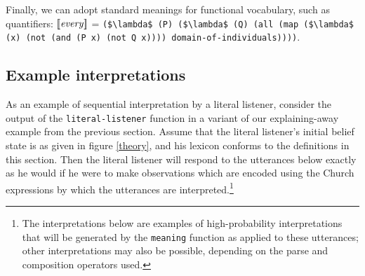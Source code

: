 \documentclass[pdfextras]{handbook}
\newcommand{\llbracket}{\ensuremath{\left [\!\left [}}%
\newcommand{\rrbracket}{\ensuremath{\right ]\!\right ]}}
\providecommand{\sv}[1]{\ensuremath{\llbracket \mathit{#1} \rrbracket}}
\begin{document}


Finally, we can adopt standard meanings for functional vocabulary, such as quantifiers: \sv{every} = \lstinline[mathescape]{($\lambda$ (P) ($\lambda$ (Q) (all (map ($\lambda$ (x) (not (and (P x) (not Q x)))) domain-of-individuals))))}.

\subsection{Example interpretations}

As an example of sequential interpretation by a literal listener, consider the output of the \lstinline{literal-listener} function in a variant of our explaining-away example from the previous section. 
Assume that the literal listener's initial belief state is as given in figure \ref{theory}, and his lexicon conforms to the definitions in this section. 
Then the literal listener will respond to the utterances below exactly as he would if he were to make observations which are encoded using the Church expressions by which the utterances are interpreted.\footnote{The interpretations below are examples of high-probability interpretations that will be generated by the \lstinline{meaning} function as applied to these utterances; other interpretations may also be possible, depending on the parse and composition operators used.}
\end{document}
